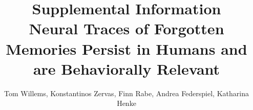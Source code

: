 \documentclass[9pt]{lapreprint}
\title{}
\title{
  Supplemental Information \\
  \vspace{1em}
  \large Neural Traces of Forgotten Memories Persist in Humans and are Behaviorally Relevant}
\author[]{Tom Willems, Konstantinos Zervas, Finn Rabe, Andrea Federspiel, Katharina Henke}
\begin{document}
\maketitle
\fussy

\newpage

\newpage


\if@endfloat\clearpage\processdelayedfloats\clearpage\fi 


%        
    
%    

%    
    
\end{document}
